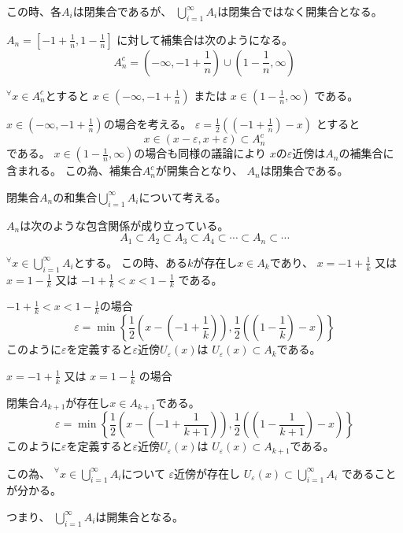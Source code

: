 \documentclass[12pt,b5paper]{ltjsarticle}
\begin{document}
この時、各$A_i$は閉集合であるが、
$\bigcup_{i=1}^{\infty}A_i$は閉集合ではなく開集合となる。


$A_n=\left[-1+\frac{1}{n},1-\frac{1}{n}\right]$
に対して補集合は次のようになる。
\begin{equation}
 A_n^{c}
  = \left( -\infty,-1+\frac{1}{n} \right)
  \cup
  \left( 1-\frac{1}{n},\infty \right)
\end{equation}


${}^{\forall}x\in A_n^{c}$とすると
$x\in \left( -\infty,-1+\frac{1}{n} \right)$
または
$x\in \left( 1-\frac{1}{n},\infty \right)$
である。

$x\in \left( -\infty,-1+\frac{1}{n} \right)$の場合を考える。
$\varepsilon = \frac{1}{2}\left( \left(-1+\frac{1}{n}\right) - x \right)$
とすると
\begin{equation}
 x\in (x-\varepsilon , x+\varepsilon) \subset A_n^c
\end{equation}
である。
$x\in \left( 1-\frac{1}{n}, \infty \right)$の場合も同様の議論により
$x$の$\varepsilon$近傍は$A_n$の補集合に含まれる。
この為、補集合$A_n^c$が開集合となり、
$A_n$は閉集合である。


閉集合$A_n$の和集合$\bigcup_{i=1}^{\infty}A_i$について考える。

$A_n$は次のような包含関係が成り立っている。
\begin{equation}
 A_1 \subset A_2 \subset A_3 \subset A_4 \subset \cdots  \subset A_n \subset \cdots
\end{equation}

${}^{\forall}x \in \bigcup_{i=1}^{\infty}A_i$とする。
この時、ある$k$が存在し$x\in A_k$であり、
$x=-1+\frac{1}{k}$
又は
$x=1-\frac{1}{k}$
又は
$-1+\frac{1}{k} < x < 1-\frac{1}{k}$
である。

$-1+\frac{1}{k} < x < 1-\frac{1}{k}$の場合
\begin{equation}
 \varepsilon = \min\left\{
                    \frac{1}{2}\left( x- \left(-1+\frac{1}{k}\right)\right),
                    \frac{1}{2}\left( \left(1-\frac{1}{k}\right)-x \right)
                   \right\}
\end{equation}
このように$\varepsilon$を定義すると$\varepsilon$近傍$U_{\varepsilon}(x)$は
$U_{\varepsilon}(x) \subset A_k$である。

$x=-1+\frac{1}{k}$
又は
$x=1-\frac{1}{k}$
の場合

閉集合$A_{k+1}$が存在し$x\in A_{k+1}$である。
\begin{equation}
 \varepsilon = \min\left\{
                    \frac{1}{2}\left( x- \left(-1+\frac{1}{k+1}\right)\right),
                    \frac{1}{2}\left( \left(1-\frac{1}{k+1}\right)-x \right)
                   \right\}
\end{equation}
このように$\varepsilon$を定義すると$\varepsilon$近傍$U_{\varepsilon}(x)$は
$U_{\varepsilon}(x) \subset A_{k+1}$である。


この為、
${}^{\forall}x \in \bigcup_{i=1}^{\infty}A_i$について
$\varepsilon$近傍が存在し
$U_{\varepsilon}(x) \subset \bigcup_{i=1}^{\infty}A_i$
であることが分かる。

つまり、
$\bigcup_{i=1}^{\infty}A_i$は開集合となる。


\hrulefill
\end{document}
